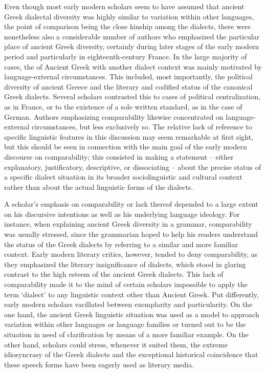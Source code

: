 Even though most early modern scholars seem to have assumed that ancient Greek dialectal diversity was highly similar to variation within other languages, the point of comparison being the close kinship among the dialects, there were nonetheless also a considerable number of authors who emphasized the particular place of ancient Greek diversity, certainly during later stages of the early modern period and particularly in eighteenth-century France. In the large majority of cases, the  of Ancient Greek with another dialect context was mainly motivated by language-external circumstances. This included, most importantly, the political diversity of ancient Greece and the literary and codified status of the canonical Greek dialects. Several scholars contrasted this to cases of political centralization, as in France, or to the existence of a sole written standard, as in the case of German. Authors emphasizing comparability likewise concentrated on language-external circumstances, but less exclusively so. The relative lack of reference to specific linguistic features in this discussion may seem remarkable at first sight, but this should be seen in connection with the main goal of the early modern discourse on comparability; this consisted in making a statement – either explanatory, justificatory, descriptive, or dissociating – about the precise status of a specific dialect situation in its broader sociolinguistic and cultural context rather than about the actual linguistic forms of the dialects.

A scholar’s emphasis on comparability or lack thereof depended to a large extent on his discursive intentions as well as his underlying language ideology. For instance, when explaining ancient Greek diversity in a grammar, comparability was usually stressed, since the grammarian hoped to help his readers understand the status of the Greek dialects by referring to a similar and more familiar context. Early modern literary critics, however, tended to deny comparability, as they emphasized the literary insignificance of  dialects, which stood in glaring contrast to the high esteem of the ancient Greek dialects. This lack of comparability made it to the mind of certain scholars impossible to apply the term ‘dialect’ to any linguistic context other than Ancient Greek. Put differently, early modern scholars vacillated between exemplarity and particularity. On the one hand, the ancient Greek linguistic situation was used as a model to approach variation within other languages or language families or turned out to be the situation in need of clarification by means of a more familiar  example. On the other hand, scholars could stress, whenever it suited them, the extreme idiosyncrasy of the Greek dialects and the exceptional historical coincidence that these speech forms have been eagerly used as literary media.

